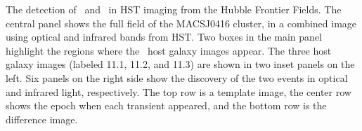 \label{fig:SpockDetectionImages}
The detection of \spockone\ and \spocktwo\ in HST imaging from the Hubble Frontier Fields. The central panel shows the full field of the MACSJ0416 cluster, in a combined image using optical and infrared bands from HST.  Two boxes in the main panel highlight the regions where the \spock\ host galaxy images appear.  The three host galaxy images (labeled 11.1, 11.2, and 11.3) are shown in two inset panels on the left.  Six panels on the right side show the discovery of the two events in optical and infrared light, respectively.  The top row is a template image, the center row shows the epoch when each transient appeared, and the bottom row is the difference image.
